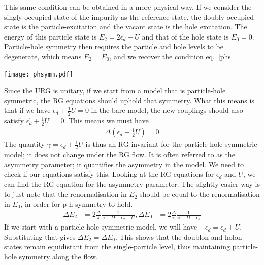 \begin{minipage}{0.5\textwidth}
    This same condition can be obtained in a more physical way. If we consider the singly-occupied state of the impurity as the reference state, the doubly-occupied state is the particle-excitation and the vacant state is the hole excitation. The energy of this particle state is \(E_2 = 2\epsilon_d + U\) and that of the hole state is \(E_0 = 0\). Particle-hole symmetry then requires the particle and hole levels to be degenerate, which means \(E_2 = E_0\), and we recover the condition eq.~\ref{phs}.
\end{minipage}
\hfill
\begin{minipage}{0.4\textwidth}
    \centering\texttt{[image: phsymm.pdf]}
\end{minipage}

Since the URG is unitary, if we start from a model that is particle-hole symmetric, the RG equations should uphold that symmetry. What this means is that if we have \(\epsilon_d + \frac{1}{2} U = 0\) in the bare model, the new couplings should also satisfy \(\epsilon_d^\prime + \frac{1}{2} U^\prime = 0\). This means we must have 
\begin{equation}\begin{aligned}
	\Delta\left(\epsilon_d + \frac{1}{2} U\right) = 0
\end{aligned}\end{equation}
The quantity \(\gamma = \epsilon_d + \frac{1}{2} U\) is thus an RG-invariant for the particle-hole symmetric model; it does not change under the RG flow. It is often referred to as the asymmetry parameter; it quantifies the asymmetry in the model. We need to check if our equations satisfy this. Looking at the RG equations for \(\epsilon_d\) and \(U\), we can find the RG equation for the asymmetry parameter. The slightly easier way is to just note that the renormalisation in \(E_2\) should be equal to the renormalisation in \(E_0\), in order for p-h symmetry to hold.
\begin{equation}\begin{aligned}
\Delta E_2 &= 2 \frac{\Delta}{\pi}\frac{1}{\omega - D + \epsilon_d + U}, \Delta E_0 &= 2 \frac{\Delta}{\pi}\frac{1}{\omega - D - \epsilon_d}
\end{aligned}\end{equation}
If we start with a particle-hole symmetric model, we will have \(-\epsilon_d = \epsilon_d + U\). Substituting that gives \(\Delta E_2= \Delta E_0\). This shows that the doublon and holon states remain equidistant from the single-particle level, thus maintaining particle-hole symmetry along the flow.
